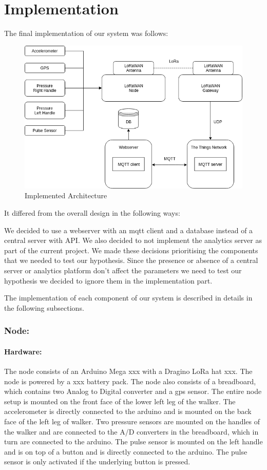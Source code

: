 \chapter{Implementation}
\label{cha:implementation}

The final implementation of our system was follows:
\begin{figure}[h]
\centering
\includegraphics[width=0.7\linewidth]{gfx/implementation_arch}
\caption[]{Implemented Architecture}
\label{fig:implementation_arch}
\end{figure}

It differed from the overall design in the following ways:

We decided to use a webserver with an mqtt client and a database instead of a central server with API. We also decided to not implement the analytics server as part of the current project. We made these decisions prioritising the components that we needed to test our hypothesis. Since the presence or absence of a central server or analytics platform don't affect the parameters we need to test our hypothesis we decided to ignore them in the implementation part.

The implementation of each component of our system is described in details in the following subsections.



\subsection{Node:} 

\subsubsection{Hardware:}
The node consists of an Arduino Mega xxx with a Dragino LoRa hat xxx. The node is powered by a xxx battery pack. The node also consists of a breadboard, which contains two Analog to Digital converter and a gps sensor. The entire node setup is mounted on the front face of the lower left leg of the walker. The accelerometer is directly connected to the arduino and is mounted on the back face of the left leg of walker. Two pressure sensors are mounted on the handles of the walker and are connected to the A/D converters in the breadboard, which in turn are connected to the arduino. The pulse sensor is mounted on the left handle and is on top of a button and is directly connected to the arduino. The pulse sensor is only activated if the underlying button is pressed. 

